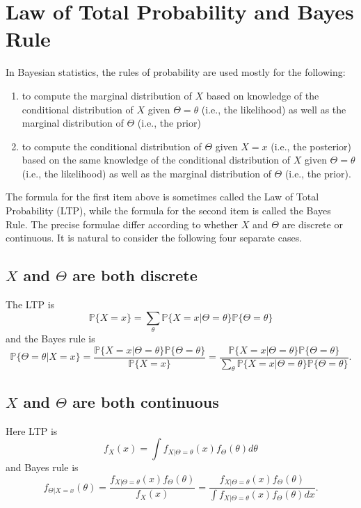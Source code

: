 \documentclass{scrartcl}
\renewcommand{\P}{{\mathbb P}}
\begin{document}
\section{Law of Total Probability and Bayes Rule}
In Bayesian statistics, the rules of probability are used mostly for
the following: 
\begin{enumerate}
\item to compute the marginal distribution of $X$ based on knowledge of
the conditional distribution of $X$ given $\Theta = \theta$ (i.e., the
likelihood) as well as
the marginal distribution of $\Theta$ (i.e., the prior)
\item to compute the conditional distribution of $\Theta$ given $X =
x$ (i.e., the posterior)
based on the same knowledge of the conditional distribution of $X$
given $\Theta = \theta$ (i.e., the likelihood) as well as the marginal
distribution of $\Theta$ (i.e., the prior). 
\end{enumerate}
The formula for the first item above is sometimes called the Law of
Total Probability (LTP), while the formula for the second item is
called the 
Bayes Rule. The precise formulae differ according to whether $X$ and
$\Theta$ are discrete or continuous. It is natural to consider the
following four separate cases. 

\subsection{$X$ and $\Theta$ are both discrete}
The LTP is
\begin{equation*}
\P\{X = x\} = \sum_{\theta} \P \{X  = x | \Theta = \theta\}
\P\{\Theta = \theta\}
\end{equation*}
and the Bayes rule is
\begin{equation*}
\P \{\Theta = \theta | X = x\} = \frac{\P\{X = x | \Theta =
\theta\}\P\{\Theta = \theta\}}{\P\{X = x\}} = \frac{\P\{X = x | \Theta =
\theta\}\P\{\Theta = \theta\}}{\sum_{\theta} \P\{X = x | \Theta =
\theta\}\P\{\Theta = \theta\}} . 
\end{equation*}

\subsection{$X$ and $\Theta$ are both continuous}
Here LTP is
\begin{equation*}
    f_X(x) = \int f_{X | \Theta = \theta}(x) f_{\Theta}(\theta) d\theta
\end{equation*}
and Bayes rule is
\begin{equation*}
    f_{\Theta | X = x}(\theta) =\frac{f_{X| \Theta = \theta}(x)
    f_{\Theta}(\theta)}{f_X(x)} = \frac{f_{X| \Theta = \theta}(x)
    f_{\Theta}(\theta)}{\int f_{X| \Theta = \theta}(x)
    f_{\Theta}(\theta) dx}. 
\end{equation*}
\end{document}
